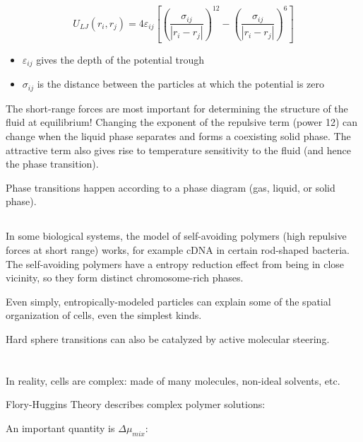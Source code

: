 \documentclass{article}
\begin{document}
\[U_{LJ}(r_i,r_j)=4\varepsilon_{ij}[(\frac{\sigma_{ij}}{|r_i-r_j|})^{12} - (\frac{\sigma_{ij}}{|r_i-r_j|})^6]\]

\begin{itemize}
    \item $\varepsilon_{ij}$ gives the depth of the potential trough
    \item $\sigma_{ij}$ is the distance between the particles at which the potential is zero
\end{itemize}

The short-range forces are most important for determining the structure of the fluid at equilibrium! Changing the exponent of the repulsive term (power 12) can change when the liquid phase separates and forms a coexisting solid phase. The attractive term also gives rise to temperature sensitivity to the fluid (and hence the phase transition).

Phase transitions happen according to a phase diagram (gas, liquid, or solid phase).

\subsection{}

In some biological systems, the model of self-avoiding polymers (high repulsive forces at short range) works, for example cDNA in certain rod-shaped bacteria. The self-avoiding polymers have a entropy reduction effect from being in close vicinity, so they form distinct chromosome-rich phases.

Even simply, entropically-modeled particles can explain some of the spatial organization of cells, even the simplest kinds.

Hard sphere transitions can also be catalyzed by active molecular steering.

\section{}

\subsection{}

In reality, cells are complex: made of many molecules, non-ideal solvents, etc.

Flory-Huggins Theory describes complex polymer solutions:

An important quantity is $\Delta \mu_{mix}$:
\end{document}
